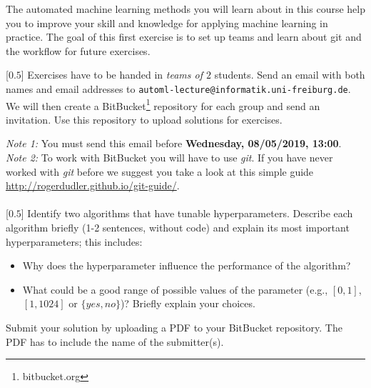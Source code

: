 \documentclass{exam}
\begin{document}
\noindent
The automated machine learning methods you will learn about in this course help you to improve your skill and knowledge for applying machine learning in practice. The goal of this first exercise is to set up teams and learn about git and the workflow for future exercises.\vspace*{5pt}

\begin{questions}
   [$0.5$]
    Exercises have to be handed in \emph{teams of $2$} students. Send an email with both names and email addresses to \texttt{automl-lecture@informatik.uni-freiburg.de}. We will then create a BitBucket\footnote{bitbucket.org} repository for each group and send an invitation. Use this repository to upload solutions for exercises.
  
  \emph{Note 1:} You must send this email before \textbf{Wednesday, 08/05/2019, 13:00}. \\
  \emph{Note 2:} To work with BitBucket you will have to use \emph{git}. If you have never worked with \emph{git} before we suggest you take a look at this simple guide \url{http://rogerdudler.github.io/git-guide/}. 
    \\\vspace*{-5pt}\hspace*{-2pt}
\\

	[$0.5$]
		Identify two algorithms that have tunable hyperparameters. Describe each algorithm briefly (1-2 sentences, without code) and explain its most important hyperparameters; this includes:
		\begin{itemize}
		  \item Why does the hyperparameter influence the performance of the algorithm? 
		  \item What could be a good range of possible values of the parameter (e.g., $[0,1]$, $[1,1024]$ or $\{yes,no\}$)? Briefly explain your choices.
		\end{itemize}
		Submit your solution by uploading a PDF to your BitBucket repository. The PDF has to include the name of the submitter(s).
		
\end{questions}
\end{document}
